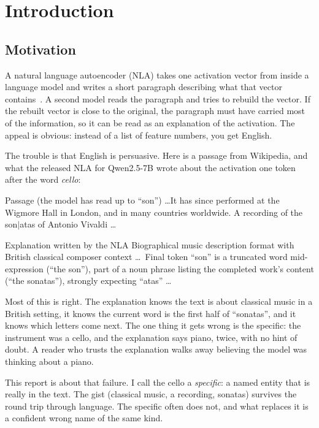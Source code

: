 \chapter{Introduction}
\label{ch:intro}

\section{Motivation}

A natural language autoencoder (NLA) takes one activation vector from inside a language model and writes a
short paragraph describing what that vector contains~\cite{frasertaliente2026nla}. A second model reads the
paragraph and tries to rebuild the vector. If the rebuilt vector is close to the original, the paragraph must
have carried most of the information, so it can be read as an explanation of the activation. The appeal is
obvious: instead of a list of feature numbers, you get English.

The trouble is that English is persuasive. Here is a passage from Wikipedia, and what the released NLA for
Qwen2.5-7B wrote about the activation one token after the word \emph{cello}:

\begin{sample}{Passage (the model has read up to ``son'')}
\ldots It has since performed at the Wigmore Hall in London, and in many countries worldwide. A recording of
the  son$|$atas of Antonio Vivaldi \ldots
\end{sample}

\begin{sample}{Explanation written by the NLA}
Biographical music description format with British classical composer context \ldots\ Final token ``son'' is
a truncated word mid-expression (``the  son''), part of a noun phrase listing the completed
work's content (``the  sonatas''), strongly expecting ``atas'' \ldots
\end{sample}

Most of this is right. The explanation knows the text is about classical music in a British setting, it
knows the current word is the first half of ``sonatas'', and it knows which letters come next.
The one thing it gets wrong is the specific: the instrument was a cello, and the explanation says piano, twice,
with no hint of doubt. A reader who trusts the explanation walks away believing the model was thinking about a
piano.

This report is about that failure. I call the cello a \emph{specific}: a named entity that is really in the
text. The gist (classical music, a recording, sonatas) survives the round trip through language. The
specific often does not, and what replaces it is a confident wrong name of the same kind.

